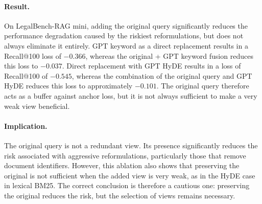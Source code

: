 \documentclass[a4paper,fleqn]{cas-dc}
\begin{document}
\paragraph{Result.}
On LegalBench-RAG mini, adding the original query
significantly reduces the performance degradation caused by
the riskiest reformulations, but does not
always eliminate it entirely. GPT keyword as a direct replacement
results in a Recall@100 loss of $-0.366$,
whereas the original + GPT keyword fusion reduces this
loss to $-0.037$. Direct replacement with GPT HyDE
results in a loss of Recall@100 of $-0.545$, whereas
the combination of the original query and GPT HyDE reduces this loss to
approximately $-0.101$. The original query therefore acts as
a buffer against anchor loss, but it is not
always sufficient to make a very weak view beneficial.
\begin{table}[h]
\centering
\caption{Comparison with/without original query for
single-reformulation configurations on
LegalBench-RAG mini. $\downarrow$: significant
deterioration after Holm correction. {--}:
non-significant result.}
\label{tab:ablation-original}
\end{table}
\paragraph{Implication.}
The original query is not a redundant view. Its
presence significantly reduces the risk associated with
aggressive reformulations, particularly those that
remove document identifiers. However,
this ablation also shows that preserving the original
is not sufficient when the added view is very
weak, as in the HyDE case in lexical BM25. The
correct conclusion is therefore a cautious one: preserving
the original reduces the risk, but the selection of
views remains necessary.
\end{document}
